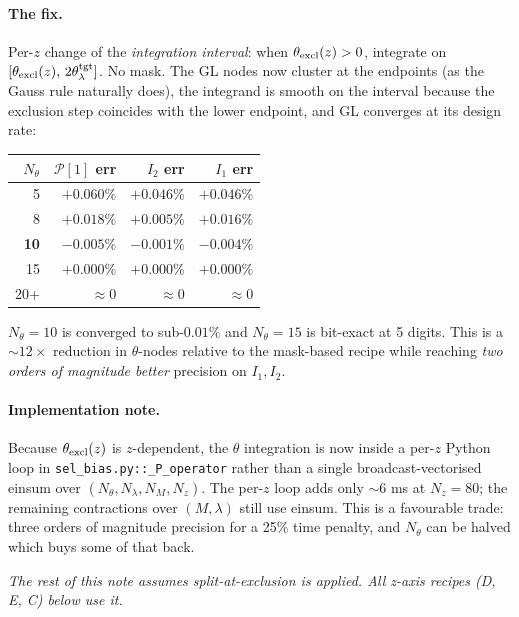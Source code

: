 \documentclass[11pt]{article}
\newcommand{\Pop}{\mathcal{P}}
\begin{document}
\paragraph{The fix.}
Per-\(z\) change of the \emph{integration interval}: when
\(\theta_{\rm excl}(z)>0\), integrate on
\([\theta_{\rm excl}(z),\,2\theta_\lambda^{\rm tgt}]\). No mask. The
GL nodes now cluster at the endpoints (as the Gauss rule naturally
does), the integrand is smooth on the interval because the
exclusion step coincides with the lower endpoint, and GL converges
at its design rate:
\begin{center}
\small
\begin{tabular}{r r r r}
\toprule
\(N_\theta\) & \(\Pop[1]\) err & \(I_2\) err & \(I_1\) err \\
\midrule
5   & \(+0.060\%\) & \(+0.046\%\) & \(+0.046\%\) \\
8   & \(+0.018\%\) & \(+0.005\%\) & \(+0.016\%\) \\
\textbf{10}  & \(\mathbf{-0.005\%}\) & \(\mathbf{-0.001\%}\) & \(\mathbf{-0.004\%}\) \\
15  & \(+0.000\%\) & \(+0.000\%\) & \(+0.000\%\) \\
20+ & \(\approx 0\) & \(\approx 0\) & \(\approx 0\) \\
\bottomrule
\end{tabular}
\end{center}
\(N_\theta=10\) is converged to sub-\(0.01\%\) and \(N_\theta=15\) is
bit-exact at 5 digits. This is a \(\sim 12\times\) reduction in
\(\theta\)-nodes relative to the mask-based recipe while reaching
\emph{two orders of magnitude better} precision on \(I_1, I_2\).

\paragraph{Implementation note.}
Because \(\theta_{\rm excl}(z)\) is \(z\)-dependent, the \(\theta\)
integration is now inside a per-\(z\) Python loop in
\texttt{sel\_bias.py::\_P\_operator} rather than a single
broadcast-vectorised einsum over \((N_\theta,N_\lambda,N_M,N_z)\).
The per-\(z\) loop adds only \(\sim 6\) ms at \(N_z=80\); the
remaining contractions over \((M,\lambda)\) still use einsum.
This is a favourable trade: three orders of magnitude precision
for a 25\% time penalty, and \(N_\theta\) can be halved which
buys some of that back.

\noindent\textit{The rest of this note assumes
split-at-exclusion is applied. All z-axis recipes (D, E, C)
below use it.}
\end{document}
